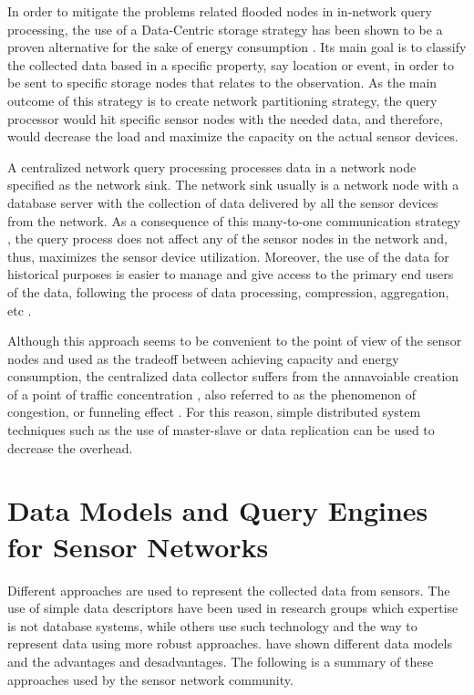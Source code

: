 In order to mitigate the problems related flooded nodes in in-network query
processing, the use of a Data-Centric storage strategy has been shown to be a
proven alternative for the sake of energy consumption \cite{sn-storage03}
\cite{sn-storage01}. Its main goal is to classify the collected data based in a
specific property, say location or event, in order to be sent to specific
storage nodes that relates to the observation. As the main outcome of this
strategy is to create network partitioning strategy, the query processor would
hit specific sensor nodes with the needed data, and therefore, would
decrease the load and maximize the capacity on the actual sensor devices.

A centralized network query processing processes data in a network node
specified as the network sink. The network sink usually is a network
node with a database server with the collection of data delivered by
all the sensor devices from the network. As a consequence of this
many-to-one communication strategy \cite{sn-storage02}, the query process does
not affect any of the sensor nodes in the network and, thus, maximizes the
sensor device utilization. Moreover, the use of the data for historical
purposes is easier to manage and give access to the primary end users of the
data, following the process of data processing, compression, aggregation, etc
\cite{sn-db-modeling02}.

Although this approach seems to be convenient to the point of view of the
sensor nodes and used as the tradeoff between achieving capacity and energy
consumption, the centralized data collector suffers from the annavoiable
creation of a point of traffic concentration \cite{sn-storage02}, also referred
to as the phenomenon of congestion, or funneling effect \cite{sn-storage04}.
For this reason, simple distributed system techniques such as the use of
master-slave or data replication can be used to decrease the overhead.

\section{Data Models and Query Engines for Sensor Networks}
\label{sec:data-models}

Different approaches are used to represent the collected data from sensors. The
use of simple data descriptors have been used in research groups which
expertise is not database systems, while others use such technology and the way
to represent data using more robust approaches. \cite{sn-data-model-survey}
have shown different data models and the advantages and desadvantages. The
following is a summary of these approaches used by the sensor network
community.

